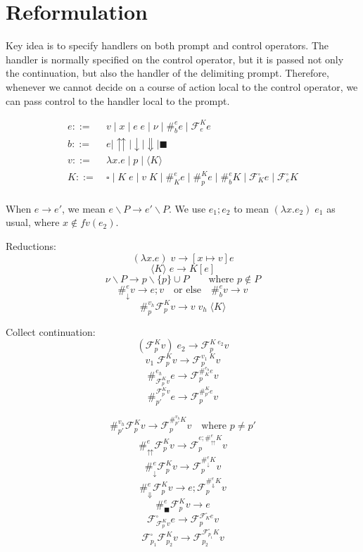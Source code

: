 \documentclass[11pt]{article}
\newcommand\x{\lambda x}
\newcommand\lseq{\mathbin\textrm{\guillemotleft}}
\newcommand\F{\mathcal{F}}
\newcommand{\angles}[1]{\langle#1\rangle}
\begin{document}
\section{Reformulation}

Key idea is to specify handlers on both prompt and control operators.
The handler is normally specified on the control operator, but it is passed not only the continuation, but also the handler of the delimiting prompt.
Therefore, whenever we cannot decide on a course of action local to the control operator, we can pass control to the handler local to the prompt.



\begin{align*}
e ::=&\ v \mid x \mid e\;e \mid \nu \mid \#^e_be \mid \mathcal{F}^K_ee \\
b ::=&\ e \mid {\upuparrows} \mid {\downarrow} \mid {\Downarrow} \mid {\blacksquare} \\
v ::=&\ \x.e \mid p \mid \angles K \\
K ::=&\ \square \mid K\;e \mid v\;K \mid \#_K^ee \mid \#_p^Ke \mid \#_b^eK \mid \F^\square_Ke \mid \F_e^\square K\\
\end{align*}

When $e \to e'$, we mean $e\backslash P \to e' \backslash P$.
We use $e_1; e_2$ to mean $(\x.e_2)\;e_1$ as usual, where $x \notin fv(e_2)$.

Reductions:
$$(\x.e)\;v \to [x \mapsto v]e$$
$$\angles K\;e \to K[e]$$
$$\nu \backslash P \to p \backslash \{p\} \cup P \qquad\textrm{where $p \notin P$}$$
$$\#^e_\downarrow v \to e; v
	\quad\textrm{or else}\quad
  \#^e_bv \to v$$
$$\#_p^{v_h}\F_p^Kv \to v\;v_h\;\angles K$$

Collect continuation:
$$(\F^K_pv)\;e_2 \to \F^{K\;e_2}_pv$$
$$v_1\;\F^K_pv \to \F^{v_1\;K}_pv$$
$$\#_{\F_p^Kv}^{e_h}e \to \F_p^{\#_K^{e_h}e}v$$
$$\#^{\F_p^Kv}_{p'}e \to \F_p^{\#^K_{p'}e}v$$

$$\#_{p'}^{v_h}\F^K_pv \to \F^{\#_{p'}^{v_h}K}_pv
  	\quad\textrm{where }p \neq p'$$
$$\#^e_\upuparrows\F^K_pv \to \F^{e;\#^e_\upuparrows K}_pv$$
$$\#^e_\downarrow \F^K_pv \to \F^{\#^e_\downarrow K}_pv$$
$$\#^e_\Downarrow \F^K_pv \to e;\F^{\#^e_\Downarrow K}_pv$$
$$\#^e_\blacksquare\F^K_pv \to e$$
$$\F^\square_{\F^K_pv}e \to \F^{\F^\square_Ke}_pv$$
$$\F^\square_{p_1}\F^K_{p_2}v \to \F^{\F^\square_{p_1}K}_{p_2}v$$
\end{document}
